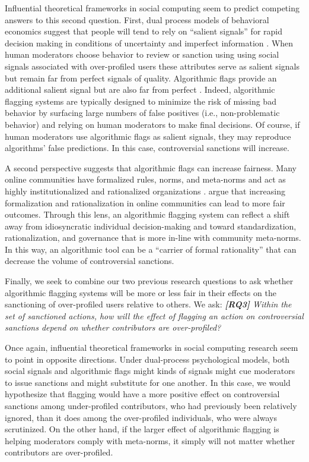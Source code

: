 \documentclass[format=acmsmall, natbib=true,  screen=true]{acmart}
\begin{document}
Influential theoretical frameworks in social computing seem to predict competing answers to this second question. 
First, dual process models of behavioral economics suggest that people will tend to rely on ``salient signals'' for rapid decision making in conditions of uncertainty and imperfect information \citep{bordalo_salience_2012, kleinberg_human_2018, tversky_judgment_1974}.  When human moderators choose behavior to review or sanction using using social signals associated with over-profiled users these attributes serve as salient signals but remain far from perfect signals of quality.
Algorithmic flags provide an additional salient signal but are also far from perfect \cite{halfaker_ores:_2019}.  Indeed, algorithmic flagging systems are typically designed to minimize the risk of missing bad behavior by surfacing large numbers of false positives (i.e., non-problematic behavior) and relying on human moderators to make final decisions.
Of course, if human moderators use algorithmic flags as salient signals, they may reproduce algorithms' false predictions. In this case, controversial sanctions will increase.

A second perspective suggests that algorithmic flags can increase fairness.
Many online communities have formalized rules, norms, and meta-norms and act as highly institutionalized and rationalized organizations \cite{butler_dont_2008, piskorski_testing_2017, weber_economy_1978}. \citet{kreiss_limits_2011} argue that increasing formalization and rationalization in online communities can lead to more fair outcomes.
Through this lens, an algorithmic flagging system can reflect a shift away from idiosyncratic individual decision-making and toward standardization, rationalization, and governance that is more in-line with community meta-norms.
In this way, an algorithmic tool can be a ``carrier of formal rationality''  \cite{lindebaum_insights_2019} that can decrease the volume of controversial sanctions.


Finally, we seek to combine our two previous research questions to ask whether algorithmic flagging systems will be more or less fair in their effects on the sanctioning of over-profiled users relative to others. We ask: \textit{\textbf{[RQ3]} Within the set of sanctioned actions, how will the effect of flagging an action on controversial sanctions depend on whether contributors are over-profiled?}
                  
Once again, influential theoretical frameworks in social computing research seem to point in opposite directions.  Under dual-process psychological models, both social signals and algorithmic flags might kinds of signals might cue moderators to issue sanctions and might substitute for one another. In this case, we would hypothesize that flagging would have a more positive effect on controversial sanctions among under-profiled contributors, who had previously been relatively ignored, than it does among the over-profiled individuals, who were always scrutinized.
On the other hand, if the larger effect of algorithmic flagging is helping moderators comply with meta-norms, it simply will not matter whether contributors are over-profiled.
\end{document}
